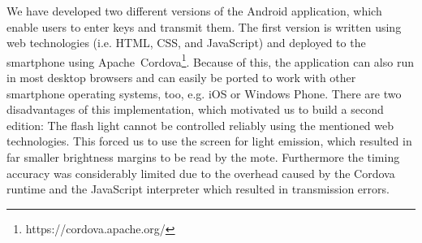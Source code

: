 \documentclass{sig-alternate} %
\begin{document}
We have developed two different versions of the Android application, which enable users to enter keys and transmit them.
The first version is written using web technologies (i.e. HTML, CSS, and JavaScript) and deployed to the smartphone using Apache~Cordova\footnote{https://cordova.apache.org/}.
Because of this, the application can also run in most desktop browsers and can easily be ported to work with other smartphone operating systems, too, e.g. iOS or Windows Phone.
There are two disadvantages of this implementation, which motivated us to build a second edition:
The flash light cannot be controlled reliably using the mentioned web technologies.
This forced us to use the screen for light emission, which resulted in far smaller brightness margins to be read by the mote.
Furthermore the timing accuracy was considerably limited due to the overhead caused by the Cordova runtime and the JavaScript interpreter which resulted in transmission errors.
\end{document}
